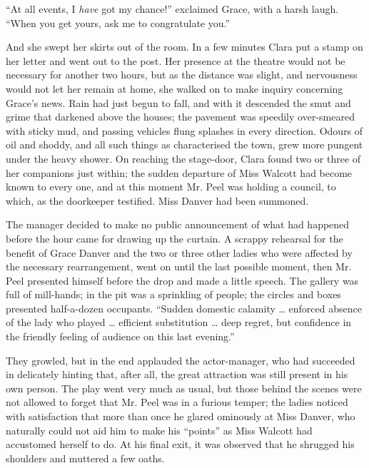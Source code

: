 ``At all events, I \emph{have} got my chance!'' exclaimed Grace, with a
harsh laugh. ``When you get yours, ask me to congratulate you.''

And she swept her skirts out of the room. In a few minutes Clara put a
stamp on her {\protect\hypertarget{202}{}{}}letter and went out to the
post. Her presence at the theatre would not be necessary for another two
hours, but as the distance was slight, and nervousness would not let her
remain at home, she walked on to make inquiry concerning Grace's news.
Rain had just begun to fall, and with it descended the smut and grime
that darkened above the houses; the pavement was speedily over-smeared
with sticky mud, and passing vehicles flung splashes in every direction.
Odours of oil and shoddy, and all such things as characterised the town,
grew more pungent under the heavy shower. On reaching the stage-door,
Clara found two or three of her companions just within; the sudden
departure of Miss Walcott had become known to every one, and at this
moment Mr. Peel was holding a council, to which, as the doorkeeper
testified. Miss Danver had been summoned.

The manager decided to make no public announcement of what had happened
before the hour came for drawing up the curtain.
{\protect\hypertarget{203}{}{}}A scrappy rehearsal for the benefit of
Grace Danver and the two or three other ladies who were affected by the
necessary rearrangement, went on until the last possible moment, then
Mr. Peel presented himself before the drop and made a little speech. The
gallery was full of mill-hands; in the pit was a sprinkling of people;
the circles and boxes presented half-a-dozen occupants. ``Sudden
domestic calamity \ldots{} enforced absence of the lady who played
\ldots{} efficient substitution \ldots{} deep regret, but confidence in
the friendly feeling of audience on this last evening.''

They growled, but in the end applauded the actor-manager, who had
succeeded in delicately hinting that, after all, the great attraction
was still present in his own person. The play went very much as usual,
but those behind the scenes were not allowed to forget that Mr. Peel was
in a furious temper; the ladies noticed with satisfaction that more than
once he glared ominously at Miss Danver, who naturally could not aid him
to make his ``points'' as Miss Walcott had accustomed
{\protect\hypertarget{204}{}{}}herself to do. At his final exit, it was
observed that he shrugged his shoulders and muttered a few oaths.

